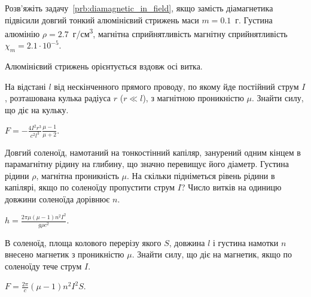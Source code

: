 \begin{problem}\label{prb:paramagnetic_in_field}
    Розв'яжіть задачу~\ref{prb:diamagnetic_in_field}, якщо замість діамагнетика підвісили довгий тонкий алюмінієвий стрижень маси $m = 0.1$~г. Густина алюмінію $\rho = 2.7$~г/см\textsuperscript{3}, магнітна сприйнятливість магнітну сприйнятливість $\chi_m = 2.1\cdot 10^{-5}$.
\begin{solution}
	Алюмінієвий стрижень орієнтується вздовж осі витка.
\end{solution}
\end{problem}

\begin{problem}
На відстані $l$ від нескінченного прямого проводу, по якому
йде постійний струм $I$, розташована кулька радіуса
$r$ ($r \ll l$), з магнітною проникністю $\mu$. Знайти силу, що діє
на кульку.
\begin{solution}
	$F = - \frac{4I^2r^3}{c^2l^3}\frac{\mu - 1}{\mu + 2}$.
\end{solution}
\end{problem}

\begin{problem}
Довгий соленоїд, намотаний на тонкостінний капіляр, занурений одним кінцем в парамагнітну рідину на глибину, що значно перевищує його діаметр. Густина рідини $\rho$, магнітна проникність $\mu$. На скільки підніметься рівень рідини в капілярі, якщо по соленоїду пропустити струм $I$? Число витків на одиницю довжини соленоїда дорівнює $n$.
\begin{solution}
	$h = \frac{2\pi\mu(\mu - 1)n^2 I^2}{g\rho c^2}$.
\end{solution}
\end{problem}




\begin{problem} %
В соленоїд, площа колового перерізу якого $S$, довжина $l$ і густина намотки $n$ внесено магнетик з проникністю $\mu$. Знайти силу, що діє на магнетик, якщо по соленоїду тече струм $I$.
\begin{solution}
	$F = \frac{2\pi}{c} (\mu - 1) n^2 I^2S$.
\end{solution}
\end{problem}

